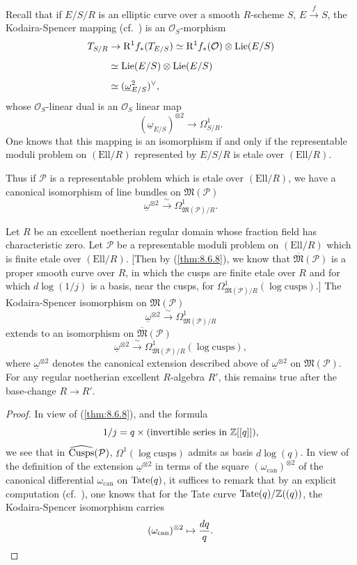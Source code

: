 \kmitem\label{item:10.13.10}
Recall that if $E/S/R$ is an elliptic curve over a smooth $R$-scheme $S$, $E \xrightarrow{f} S$, the Kodaira-Spencer mapping (cf.~\cite[A1.4]{K2}) is an $\mathcal{O}_S$-morphism
\[
\begin{aligned}
T_{S/R} &\to \mathrm{R}^1 f_*(T_{E/S}) \simeq \mathrm{R}^1 f_*(\mathcal{O}) \underset{}{\otimes} \operatorname{Lie}(E/S) \\
&\simeq \operatorname{Lie}(E/S) \underset{}{\otimes} \operatorname{Lie}(E/S) \\
&\simeq (\underline{\omega}^2_{E/S})^\vee ,
\end{aligned}
\]
whose $\mathcal{O}_S$-linear dual is an $\mathcal{O}_S$ linear map
\[
(\underline{\omega}_{E/S})^{\otimes 2} \to \Omega^1_{S/R} .
\]
One knows that this mapping is an isomorphism if and only if the representable moduli problem on $(\mathrm{Ell}/R)$ represented by $E/S/R$ is etale over $(\mathrm{Ell}/R)$.

Thus if $\mathcal{P}$ is a representable problem which is etale over $(\mathrm{Ell}/R)$, we have a canonical isomorphism of line bundles on $\mathfrak{M}(\mathcal{P})$
\[
\underline{\omega}^{\otimes 2} \xrightarrow{\ \sim\ } \Omega^1_{\mathfrak{M}(\mathcal{P})/R} .
\]

\begin{kthm}\label{thm:10.13.11}
Let $R$ be an excellent noetherian regular domain whose fraction field has characteristic zero. Let $\mathcal{P}$ be a representable moduli problem on $(\mathrm{Ell}/R)$ which is finite etale over $(\mathrm{Ell}/R)$. [Then by (\ref{thm:8.6.8}), we know that $\overline{\mathfrak{M}}(\mathcal{P})$ is a proper smooth curve over $R$, in which the cusps are finite etale over $R$ and for which $d\log(1/j)$ is a basis, near the cusps, for $\Omega^1_{\overline{\mathfrak{M}}(\mathcal{P})/R}(\log\mathrm{cusps})$.] The Kodaira-Spencer isomorphism on $\mathfrak{M}(\mathcal{P})$
\[
\underline{\omega}^{\otimes 2} \xrightarrow{\ \sim\ } \Omega^1_{\mathfrak{M}(\mathcal{P})/R}
\]
extends to an isomorphism on $\overline{\mathfrak{M}}(\mathcal{P})$
\[
\underline{\omega}^{\otimes 2} \xrightarrow{\ \sim\ } \Omega^1_{\overline{\mathfrak{M}}(\mathcal{P})/R}(\log\mathrm{cusps}) ,
\]
where $\underline{\omega}^{\otimes 2}$ denotes the canonical extension described above of $\underline{\omega}^{\otimes 2}$ on $\mathfrak{M}(\mathcal{P})$. For any regular noetherian excellent $R$-algebra $R'$, this remains true after the base-change $R \to R'$.
\end{kthm}

\begin{proof}
In view of (\ref{thm:8.6.8}), and the formula
\[
1/j = q \times (\text{invertible series in } \mathbb{Z}[[q]]) ,
\]
we see that in $\widehat{\operatorname{Cusps}}(\mathcal{P})$, $\Omega^1(\log\mathrm{cusps})$ admits as basis $d\log(q)$. In view of the definition of the extension $\underline{\omega}^{\otimes 2}$ in terms of the square $(\omega_{\mathrm{can}})^{\otimes 2}$ of the canonical differential $\omega_{\mathrm{can}}$ on $\mathrm{Tate}(q)$, it suffices to remark that by an explicit computation (cf.~\cite{K2}), one knows that for the Tate curve $\mathrm{Tate}(q)/\mathbb{Z}((q))$, the Kodaira-Spencer isomorphism carries
\[
(\omega_{\mathrm{can}})^{\otimes 2} \mapsto \frac{dq}{q} . \qedhere
\]
\end{proof}

